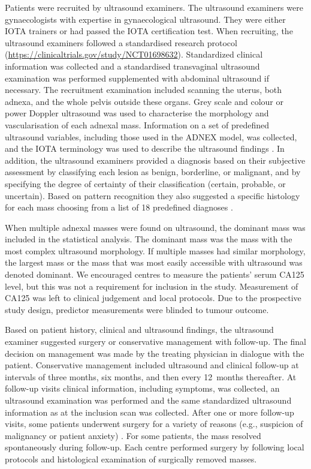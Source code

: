 Patients were recruited by ultrasound examiners. The ultrasound examiners were gynaecologists with expertise in gynaecological ultrasound. They were either \gls{IOTA} trainers or had passed the \gls{IOTA} certification test. When recruiting, the ultrasound examiners followed a standardised research protocol (\url{https://clinicaltrials.gov/study/NCT01698632}). Standardized clinical information was collected and a standardised transvaginal ultrasound examination was performed supplemented with abdominal ultrasound if necessary. The recruitment examination included scanning the uterus, both adnexa, and the whole pelvis outside these organs. Grey scale and colour or power Doppler ultrasound was used to characterise the morphology and vascularisation of each adnexal mass. Information on a set of predefined ultrasound variables, including those used in the \gls{ADNEX} model, was collected, and the \gls{IOTA} terminology was used to describe the ultrasound findings \cite{timmermanTermsDefinitionsMeasurements2000}. In addition, the ultrasound examiners provided a diagnosis based on their subjective assessment by classifying each lesion as benign, borderline, or malignant, and by specifying the degree of certainty of their classification (certain, probable, or uncertain). Based on pattern recognition they also suggested a specific histology for each mass choosing from a list of 18 predefined diagnoses \cite{valentinUseMorphologyCharacterize2004}.

When multiple adnexal masses were found on ultrasound, the dominant mass was included in the statistical analysis. The dominant mass was the mass with the most complex ultrasound morphology. If multiple masses had similar morphology, the largest mass or the mass that was most easily accessible with ultrasound was denoted dominant. We encouraged centres to measure the patients' serum \gls{CA125} level, but this was not a requirement for inclusion in the study. Measurement of \gls{CA125} was left to clinical judgement and local protocols. Due to the prospective study design, predictor measurements were blinded to tumour outcome.

Based on patient history, clinical and ultrasound findings, the ultrasound examiner suggested surgery or conservative management with follow-up. The final decision on management was made by the treating physician in dialogue with the patient. Conservative management included ultrasound and clinical follow-up at intervals of three months, six months, and then every 12~months thereafter. At follow-up visits clinical information, including symptoms, was collected, an ultrasound examination was performed and the same standardized ultrasound information as at the inclusion scan was collected. After one or more follow-up visits, some patients underwent surgery for a variety of reasons (e.g., suspicion of malignancy or patient anxiety) \cite{froymanRiskComplicationsPatients2019}. For some patients, the mass resolved spontaneously during follow-up. Each centre performed surgery by following local protocols and histological examination of surgically removed masses.


